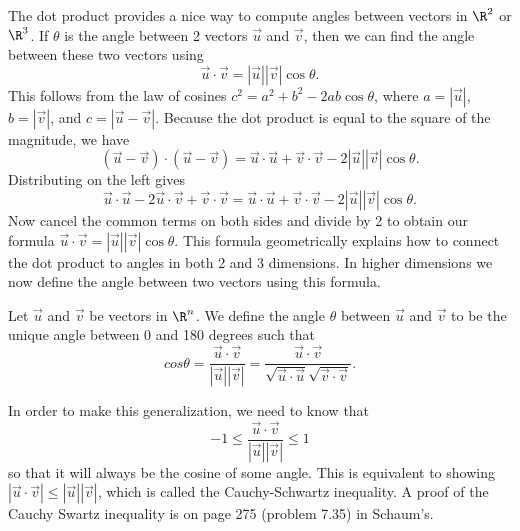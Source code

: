 The dot product provides a nice way to compute angles between vectors in $\R^2$ or $\R^3$.  
If $\theta$ is the angle between 2 vectors $\vec u$ and $\vec v$, then we can find the angle between these two vectors using 
$$\vec u \cdot \vec v = |\vec u||\vec v|\cos \theta.$$
This follows from the law of cosines $c^2 = a^2 + b^2 -2ab \cos \theta$, where $a=|\vec u|$, $b=|\vec v|$, and $c = |\vec u-\vec v|$. 
Because the dot product is equal to the square of the magnitude, we have 
$$(\vec u-\vec v)\cdot (\vec u-\vec v) = \vec u\cdot \vec u +\vec v\cdot \vec v -2|\vec u||\vec v|\cos \theta.$$
Distributing on the left gives 
$$\vec u\cdot \vec u - 2 \vec u \cdot \vec v +\vec v\cdot \vec v = \vec u\cdot \vec u +\vec v\cdot \vec v -2|\vec u||\vec v|\cos \theta.$$
Now cancel the common terms on both sides and divide by 2 to obtain our formula $\vec u \cdot \vec v = |\vec u||\vec v|\cos \theta$.  
This formula geometrically explains how to connect the dot product to angles in both 2 and 3 dimensions.  
In higher dimensions we now define the angle between two vectors using this formula.

\begin{definition}
Let $\vec u$ and $\vec v$ be vectors in $\R^n$. We define the angle $\theta$ between $\vec u$ and $\vec v$ to be the unique angle between 0 and 180 degrees such that 
$$cos \theta 
= \frac{\vec u\cdot \vec v}{|\vec u||\vec v|}
= \frac{\vec u\cdot \vec v}{\sqrt{\vec u\cdot\vec u}\sqrt{\vec v\cdot\vec v}}.$$
\end{definition}
In order to make this generalization, we need to know that $$-1\leq \dfrac{\vec u\cdot\vec v}{|\vec u||\vec v|}\leq 1$$ so that it will always be the cosine of some angle.  
This is equivalent to showing $|\vec u\cdot\vec v|\leq |\vec u||\vec v|$, which is called the Cauchy-Schwartz inequality. A proof of the Cauchy Swartz inequality is on page 275 (problem 7.35) in Schaum's.


